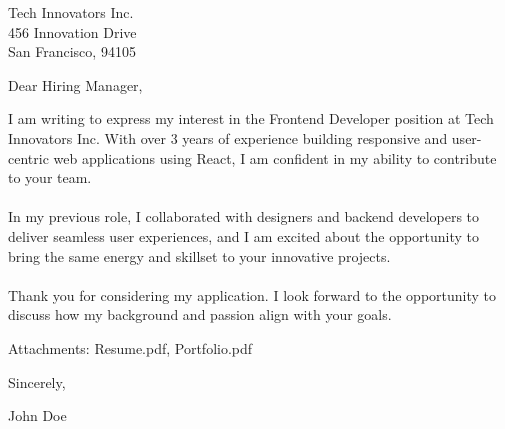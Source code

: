 \documentclass[11pt,a4paper]{letter}
\begin{document}
\begin{letter}{
Tech Innovators Inc.\\
456 Innovation Drive\\
San Francisco, 94105
}

\address{
John Doe\\
123 Main Street\\
New York, 10001\\
+1234567890\\
\href{mailto:john.doe@example.com}{john.doe@example.com}
}

\date{April 15, 2025}

\opening{Dear Hiring Manager,}

I am writing to express my interest in the Frontend Developer position at Tech Innovators Inc. With over 3 years of experience building responsive and user-centric web applications using React, I am confident in my ability to contribute to your team.\\
\\
In my previous role, I collaborated with designers and backend developers to deliver seamless user experiences, and I am excited about the opportunity to bring the same energy and skillset to your innovative projects.\\
\\
Thank you for considering my application. I look forward to the opportunity to discuss how my background and passion align with your goals.

\vspace{\baselineskip}
\noindent Attachments: Resume.pdf, Portfolio.pdf

\opening{Sincerely,}John Doe

\end{letter}
\end{document}
